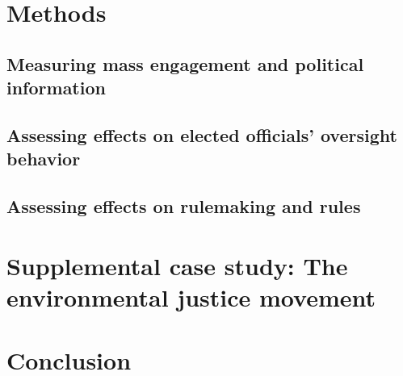 \documentclass{article}
\begin{document}
\section{Methods}

\subsection{Measuring mass engagement and political information}
\label{whyMail-methods}


\subsection{Assessing effects on elected officials' oversight behavior} \label{principals-methods}


\subsection{Assessing effects on rulemaking and rules}
\label{influence-methods}







\section{Supplemental case study: The environmental justice movement} \label{ej}




\section{Conclusion}

\end{document}
